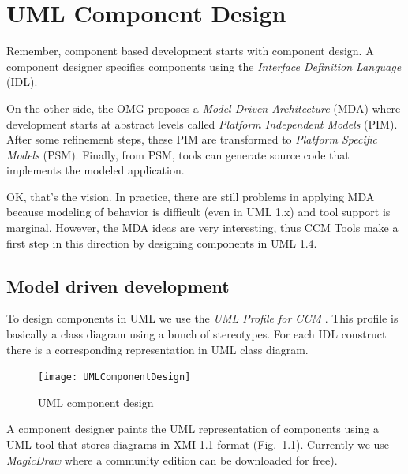 \chapter{UML Component Design}

Remember, component based development starts with component design.
A component designer specifies components using the 
{\it Interface Definition Language} (IDL).

On the other side, the OMG proposes a {\it Model Driven Architecture} (MDA) 
where development starts at abstract levels called 
{\it Platform Independent Models} (PIM).
After some refinement steps, these PIM are transformed to 
{\it Platform Specific Models} (PSM).
Finally, from PSM, tools can generate source code that implements the modeled 
application.

OK, that's the vision. 
In practice, there are still problems in applying MDA because modeling of 
behavior is difficult (even in UML 1.x) and tool support is marginal. 
However, the MDA ideas are very interesting, thus CCM Tools make a first step 
in this direction by designing components in UML 1.4.

\section{Model driven development}

To design components in UML we use the {\it UML Profile for CCM} 
\cite{UML-CORBA-Profile,UML-CCM-Profile}. 
This profile is basically a class diagram using a bunch of stereotypes.
For each IDL construct there is a corresponding representation in UML class 
diagram.

\begin{figure}[htbp]
    \begin{center}
        \texttt{[image: UMLComponentDesign]}
        \caption{UML component design}
        \label{fig:uml-component-design}
    \end{center}
\end{figure}

A component designer paints the UML representation of components using a UML 
tool that stores diagrams in XMI 1.1 format 
(Fig.~\ref{fig:uml-component-design}).
Currently we use {\it MagicDraw} where a community edition can be downloaded 
for free).


